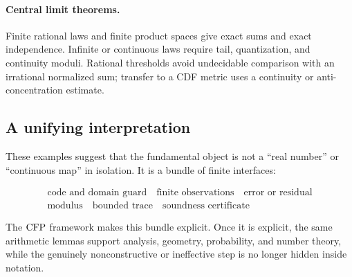 \paragraph{Central limit theorems.}
Finite rational laws and finite product spaces give exact sums and exact
independence.  Infinite or continuous laws require tail, quantization, and
continuity moduli.  Rational thresholds avoid undecidable comparison with an
irrational normalized sum; transfer to a CDF metric uses a continuity or
anti-concentration estimate.

\subsection{A unifying interpretation}

These examples suggest that the fundamental object is not a ``real number''
or ``continuous map'' in isolation.  It is a bundle of finite interfaces:

\[
\begin{gathered}
\text{code and domain guard}\quad\text{finite observations}\quad
\text{error or residual}\\
\text{modulus}\quad\text{bounded trace}\quad
\text{soundness certificate}
\end{gathered}
\]

The \(\mathrm{CFP}\) framework makes this bundle explicit.  Once it is explicit, the
same arithmetic lemmas support analysis, geometry, probability, and number
theory, while the genuinely nonconstructive or ineffective step is no longer
hidden inside notation.
